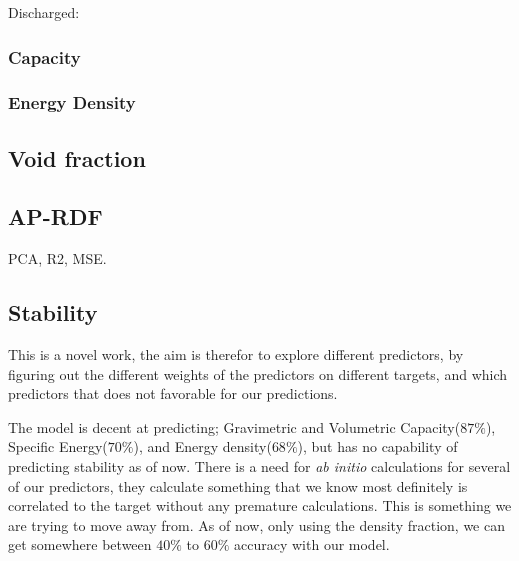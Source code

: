 Discharged:

\subsubsection{Capacity}

\subsubsection{Energy Density}


\subsection{Void fraction}







\subsection{AP-RDF}
PCA, R2, MSE.

\subsection{Stability}







This is a novel work, the aim is therefor to explore different predictors, by figuring out the different weights of the predictors on different targets, and which predictors that does not favorable for our predictions. 

The model is decent at predicting; Gravimetric and Volumetric Capacity($87\%$), Specific Energy($70\%$), and Energy density($68\%$), but has no capability of predicting stability as of now. There is a need for \textit{ab initio} calculations for several of our predictors, they calculate something that we know most definitely is correlated to the target without any premature calculations. This is something we are trying to move away from. As of now, only using the density fraction, we can get somewhere between $40 \%$ to $60 \%$ accuracy with our model. 

